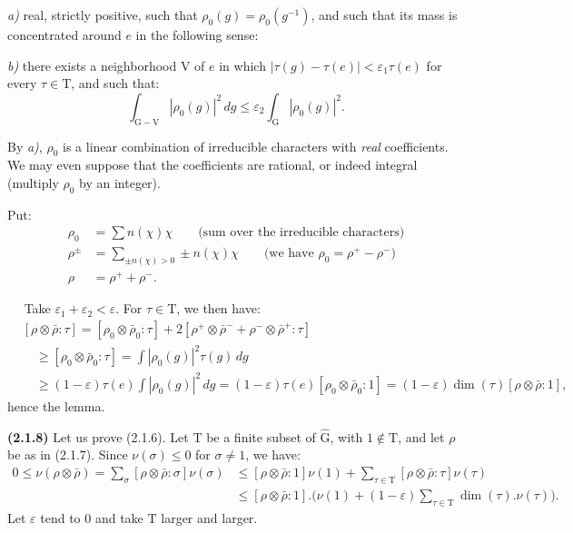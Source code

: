 \documentclass[11pt,leqno]{article}
\newcommand{\Page}[1]{\ifvmode\noindent\else\unskip\ \fi{\footnotesize\textcolor{gray}{[p.\,#1]}}\ \ignorespaces}
\begin{document}
\noindent\textit{a)} real, strictly positive, such that \(\rho_0(g)=\rho_0(g^{-1})\), and such that its mass is concentrated around \(e\) in the following sense:

\noindent\textit{b)} there exists a neighborhood \(\mathrm{V}\) of \(e\) in which \(|\tau(g)-\tau(e)|<\varepsilon_1\tau(e)\) for every \(\tau\in\mathrm{T}\), and such that:
\[
\int_{\mathrm{G}-\mathrm{V}}|\rho_0(g)|^2\,dg
 \leq\varepsilon_2\int_{\mathrm{G}}|\rho_0(g)|^2.
\]

By \textit{a)}, \(\rho_0\) is a linear combination of irreducible characters with \textit{real} coefficients. We may even suppose that the coefficients are rational, or indeed integral (multiply \(\rho_0\) by an integer).

Put:
\begin{align*}
\rho_0&=\sum n(\chi)\chi
  \qquad\text{(sum over the irreducible characters)}\\
\rho^\pm&=\sum_{\pm n(\chi)>0}\pm n(\chi)\chi
  \qquad\text{(we have }\rho_0=\rho^+-\rho^-\text{)}\\
\rho&=\rho^++\rho^-.
\tag*{and :}
\end{align*}

\Page{191}
Take \(\varepsilon_1+\varepsilon_2<\varepsilon\). For \(\tau\in\mathrm{T}\), we then have:
\[
\begin{aligned}
&[\rho\otimes\bar{\rho}:\tau]
 =[\rho_0\otimes\bar{\rho}_0:\tau]
   +2[\rho^+\otimes\bar{\rho}^-+\rho^-\otimes\bar{\rho}^+:\tau]\\
&\quad\geq[\rho_0\otimes\bar{\rho}_0:\tau]
 =\int|\rho_0(g)|^2\tau(g)\,dg\\
&\quad\geq(1-\varepsilon)\tau(e)\int|\rho_0(g)|^2\,dg
 =(1-\varepsilon)\tau(e)[\rho_0\otimes\bar{\rho}_0:1]
 =(1-\varepsilon)\dim(\tau)[\rho\otimes\bar{\rho}:1],
\end{aligned}
\]
hence the lemma.

\textbf{(2.1.8)} Let us prove (2.1.6). Let \(\mathrm{T}\) be a finite subset of \(\widehat{\mathrm{G}}\), with \(1\notin\mathrm{T}\), and let \(\rho\) be as in (2.1.7). Since \(\nu(\sigma)\leq0\) for \(\sigma\neq1\), we have:
\[
\begin{aligned}
0\leq\nu(\rho\otimes\bar{\rho})
 =\sum_\sigma[\rho\otimes\bar{\rho}:\sigma]\nu(\sigma)
 &\leq[\rho\otimes\bar{\rho}:1]\nu(1)
   +\sum_{\tau\in\mathrm{T}}[\rho\otimes\bar{\rho}:\tau]\nu(\tau)\\
 &\leq[\rho\otimes\bar{\rho}:1].
 \biggl(\nu(1)+(1-\varepsilon)
   \sum_{\tau\in\mathrm{T}}\dim(\tau).\nu(\tau)\biggr).
\end{aligned}
\]
Let \(\varepsilon\) tend to \(0\) and take \(\mathrm{T}\) larger and larger.
\end{document}
